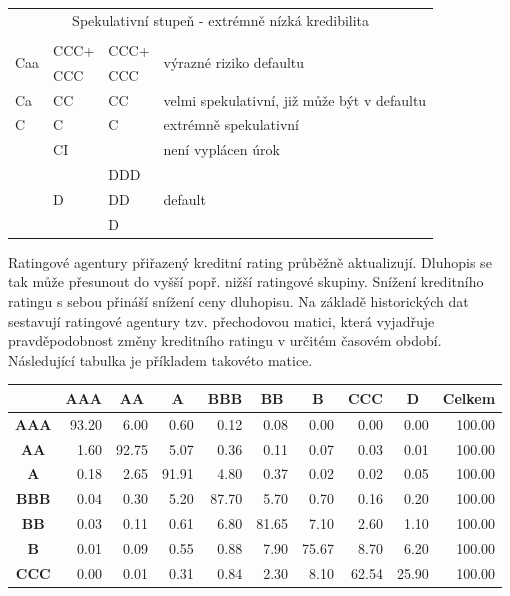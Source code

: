 \documentclass[a4paper]{book}
\begin{document}
\begin{center}
\begin{tabular}{l l l l}
\hline
\hline
\multicolumn{4}{c}{Spekulativní stupeň - extrémně nízká kredibilita}\\
\multicolumn{4}{c}{}\\
\hline
\multirow{2}{*}{Caa}   & CCC+ & CCC+ & \multirow{2}{*}{výrazné riziko defaultu}\\
     &  CCC & CCC & \\
\hline
Ca   & CC & CC & velmi spekulativní, již může být v defaultu\\
\hline
C    & C  & C  & extrémně spekulativní\\
\hline
     & CI &    & není vyplácen úrok\\
\hline
\multirow{3}{*}{} & \multirow{3}{*}{D} & DDD & \multirow{3}{*}{default}\\
                  &                    & DD  & \\
                  &                    & D   & \\
\end{tabular}
\end{center}
Ratingové agentury přiřazený kreditní rating průběžně aktualizují. Dluhopis se tak může přesunout do vyšší popř. nižší ratingové skupiny. Snížení kreditního ratingu s sebou přináší snížení ceny dluhopisu. Na základě historických dat sestavují ratingové agentury tzv. přechodovou matici, která vyjadřuje pravděpodobnost změny kreditního ratingu v určitém časovém období. Následující tabulka je příkladem takovéto matice.
\begin{center}
\begin{tabular}{c | r r r r r r r r r}
             & \multicolumn{1}{c}{\textbf{AAA}} & \multicolumn{1}{c}{\textbf{AA}} & \multicolumn{1}{c}{\textbf{A}} & \multicolumn{1}{c}{\textbf{BBB}} & \multicolumn{1}{c}{\textbf{BB}} & \multicolumn{1}{c}{\textbf{B}} & \multicolumn{1}{c}{\textbf{CCC}} & \multicolumn{1}{c}{\textbf{D}} & \multicolumn{1}{c}{\textbf{Celkem}} \\
\hline
\textbf{AAA} & 93.20 &  6.00 &  0.60 &  0.12 &  0.08 &  0.00 &  0.00 &  0.00 & 100.00\\
\textbf{AA}  &  1.60 & 92.75 &  5.07 &  0.36 &  0.11 &  0.07 &  0.03 &  0.01 & 100.00\\
\textbf{A}   &  0.18 &  2.65 & 91.91 &  4.80 &  0.37 &  0.02 &  0.02 &  0.05 & 100.00\\
\textbf{BBB} &  0.04 &  0.30 &  5.20 & 87.70 &  5.70 &  0.70 &  0.16 &  0.20 & 100.00\\
\textbf{BB}  &  0.03 &  0.11 &  0.61 &  6.80 & 81.65 &  7.10 &  2.60 &  1.10 & 100.00\\
\textbf{B}   &  0.01 &  0.09 &  0.55 &  0.88 &  7.90 & 75.67 &  8.70 &  6.20 & 100.00\\
\textbf{CCC} &  0.00 &  0.01 &  0.31 &  0.84 &  2.30 &  8.10 & 62.54 & 25.90 & 100.00\\
\end{tabular}
\end{center}
\end{document}
